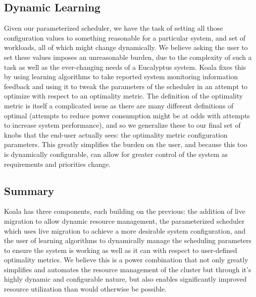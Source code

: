 \subsection{Dynamic Learning}
Given our parameterized scheduler, we have the task of setting all those configuration values to something reasonable for a particular system, and set of workloads, all of which might change dynamically.  We believe asking the user to set these values imposes an unreasonable burden, due to the complexity of such a task as well as the ever-changing needs of a Eucalyptus system.  Koala fixes this by using learning algorithms to take reported system monitoring information feedback and using it to tweak the parameters of the scheduler in an attempt to optimize with respect to an optimality metric.  The definition of the optimality metric is itself a complicated issue as there are many different definitions of optimal (attempts to reduce power consumption might be at odds with attempts to increase system performance), and so we generalize these to our final set of knobs that the end-user actually sees: the optimality metric configuration parameters.  This greatly simplifies the burden on the user, and because this too is dynamically configurable, can allow for greater control of the system as requirements and priorities change.

\subsection{Summary}

Koala has three components, each building on the previous: the addition of live migration to allow dynamic resource management, the parameterized scheduler which uses live migration to achieve a more desirable system configuration, and the user of learning algorithms to dynamically manage the scheduling parameters to ensure the system is working as well as it can with respect to user-defined optimality metrics.  We believe this is a power combination that not only greatly simplifies and automates the resource management of the cluster but through it's highly dynamic and configurable nature, but also enables significantly improved resource utilization than would otherwise be possible.
